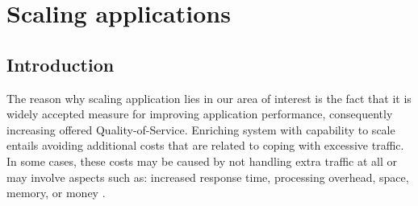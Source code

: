 \chapter{Scaling applications}


\section{Introduction}

The reason why scaling application lies in our area of interest is the fact that it is widely accepted measure for improving application performance, consequently increasing offered Quality-of-Service. Enriching system with capability to scale entails avoiding additional costs that are related to coping with excessive traffic. In some cases, these costs may be caused by not handling extra traffic at all or may involve aspects such as: increased response time, processing overhead, space, memory, or money \cite{Bo00}. 

